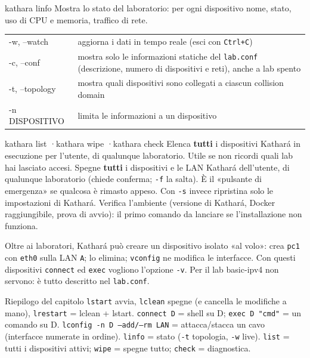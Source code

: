 \begin{scheda}{kathara linfo}
Mostra lo stato del laboratorio: per ogni dispositivo nome, stato, uso di CPU e memoria, traffico di rete.
\begin{tabularx}{\linewidth}{>{\ttfamily\small}l Y}
-w, --watch & aggiorna i dati in tempo reale (esci con \texttt{Ctrl+C})\\
-c, --conf & mostra solo le informazioni statiche del \texttt{lab.conf} (descrizione, numero di dispositivi e reti), anche a lab spento\\
-t, --topology & mostra quali dispositivi sono collegati a ciascun collision domain\\
-n DISPOSITIVO & limita le informazioni a un dispositivo\\
\end{tabularx}
\end{scheda}

\begin{scheda}{kathara list \quad·\quad kathara wipe \quad·\quad kathara check}
Elenca \textbf{tutti} i dispositivi Kathará in esecuzione per l'utente, di qualunque laboratorio. Utile se non ricordi quali lab hai lasciato accesi.
Spegne \textbf{tutti} i dispositivi e le LAN Kathará dell'utente, di qualunque laboratorio (chiede conferma; \texttt{-f} la salta). È il «pulsante di emergenza» se qualcosa è rimasto appeso. Con \texttt{-s} invece ripristina solo le impostazioni di Kathará.
Verifica l'ambiente (versione di Kathará, Docker raggiungibile, prova di avvio): il primo comando da lanciare se l'installazione non funziona.
\end{scheda}

\begin{mlbox}
Oltre ai laboratori, Kathará può creare un dispositivo isolato «al volo»:  crea \texttt{pc1} con \texttt{eth0} sulla LAN \texttt{A};  lo elimina; \texttt{vconfig} ne modifica le interfacce. Con questi dispositivi \texttt{connect} ed \texttt{exec} vogliono l'opzione \texttt{-v}. Per il lab basic-ipv4 non servono: è tutto descritto nel \texttt{lab.conf}.
\end{mlbox}

\begin{appunti}{Riepilogo del capitolo}
\texttt{lstart} avvia, \texttt{lclean} spegne (e cancella le modifiche a mano), \texttt{lrestart} = lclean + lstart. \texttt{connect D} = shell su D; \texttt{exec D "cmd"} = un comando su D. \texttt{lconfig -n D --add/--rm LAN} = attacca/stacca un cavo (interfacce numerate in ordine). \texttt{linfo} = stato (\texttt{-t} topologia, \texttt{-w} live). \texttt{list} = tutti i dispositivi attivi; \texttt{wipe} = spegne tutto; \texttt{check} = diagnostica.
\end{appunti}
